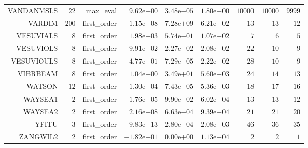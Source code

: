 \begin{longtable}{rrrrrrrrr}
VANDANMSLS & \(    22\) & max\_eval & \( 9.62\)e\(+00\) & \( 3.48\)e\(-05\) & \( 1.80\)e\(+00\) & \( 10000\) & \( 10000\) & \(  9999\) \\
VARDIM & \(   200\) & first\_order & \( 1.15\)e\(+08\) & \( 7.28\)e\(+09\) & \( 6.21\)e\(-02\) & \(    13\) & \(    13\) & \(    12\) \\
VESUVIALS & \(     8\) & first\_order & \( 1.98\)e\(+03\) & \( 5.74\)e\(-01\) & \( 1.07\)e\(-02\) & \(     7\) & \(     6\) & \(     5\) \\
VESUVIOLS & \(     8\) & first\_order & \( 9.91\)e\(+02\) & \( 2.27\)e\(-02\) & \( 2.08\)e\(-02\) & \(    22\) & \(    10\) & \(     9\) \\
VESUVIOULS & \(     8\) & first\_order & \( 4.77\)e\(-01\) & \( 7.29\)e\(-05\) & \( 2.22\)e\(-02\) & \(    28\) & \(    10\) & \(     9\) \\
VIBRBEAM & \(     8\) & first\_order & \( 1.04\)e\(+00\) & \( 3.49\)e\(+01\) & \( 5.60\)e\(-03\) & \(    24\) & \(    14\) & \(    13\) \\
WATSON & \(    12\) & first\_order & \( 1.30\)e\(-04\) & \( 7.43\)e\(-05\) & \( 5.36\)e\(-03\) & \(    18\) & \(    17\) & \(    16\) \\
WAYSEA1 & \(     2\) & first\_order & \( 1.76\)e\(-05\) & \( 9.90\)e\(-02\) & \( 6.02\)e\(-04\) & \(    13\) & \(    13\) & \(    12\) \\
WAYSEA2 & \(     2\) & first\_order & \( 2.16\)e\(-08\) & \( 6.63\)e\(-04\) & \( 9.39\)e\(-04\) & \(    21\) & \(    21\) & \(    20\) \\
YFITU & \(     3\) & first\_order & \( 9.83\)e\(-13\) & \( 2.80\)e\(-04\) & \( 2.08\)e\(-03\) & \(    46\) & \(    36\) & \(    35\) \\
ZANGWIL2 & \(     2\) & first\_order & \(-1.82\)e\(+01\) & \( 0.00\)e\(+00\) & \( 1.13\)e\(-04\) & \(     2\) & \(     2\) & \(     1\) \\\hline
\end{longtable}
